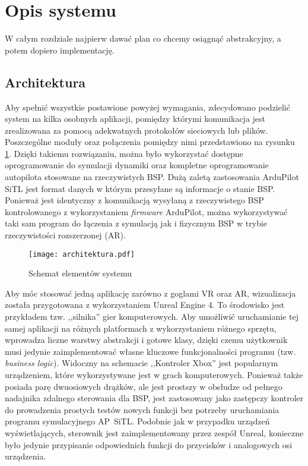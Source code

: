 \newpage
\section{Opis systemu}
\label{sec:opis}

\begin{todo}
W całym rozdziale najpierw dawać plan co chcemy osiągnąć abstrakcyjny, a potem dopiero implementację.
\end{todo}

\subsection{Architektura}
\label{sec:architektura}

Aby spełnić wszystkie postawione powyżej wymagania, zdecydowano podzielić system na kilka osobnych aplikacji, pomiędzy którymi komunikacja jest zrealizowana za pomocą adekwatnych protokołów sieciowych lub plików. Poszczególne moduły oraz połączenia pomiędzy nimi przedstawiono na rysunku \ref{fig:architektura}. Dzięki takiemu rozwiązaniu, można było wykorzystać dostępne oprogramowanie do symulacji dynamiki oraz kompletne oprogramowanie autopilota stosowane na rzeczywistych BSP. Dużą zaletą zastosowania ArduPilot SiTL\cite{soft:sitl} jest format danych w którym przesyłane są informacje o stanie BSP. Ponieważ jest identyczny z komunikacją wysyłaną z rzeczywistego BSP kontrolowanego z wykorzystaniem \emph{firmware} ArduPilot, można wykorzystywać taki sam program do łączenia z symulacją jak i fizycznym BSP w trybie rzeczywistości rozszerzonej (AR).

\begin{figure}[!h]
    \caption{Schemat elementów systemu}
    \label{fig:architektura}
    \centering \texttt{[image: architektura.pdf]}
\end{figure}

Aby móc stosować jedną aplikację zarówno z goglami VR oraz AR, wizualizacja została przygotowana z wykorzystaniem Unreal Engine 4\cite{soft:ue4}. To środowisko jest przykładem tzw. ,,silnika'' gier komputerowych. Aby umożliwić uruchamianie tej samej aplikacji na różnych platformach z wykorzystaniem różnego sprzętu, wprowadza liczne warstwy abstrakcji i gotowe klasy, dzięki czemu użytkownik musi jedynie zaimplementować własne kluczowe funkcjonalności programu (tzw. \emph{business logic}). Widoczny na schemacie ,,Kontroler Xbox'' jest popularnym urządzeniem, które wykorzystywane jest w grach komputerowych. Ponieważ także posiada parę dwuosiowych drążków, ale jest prostszy w obsłudze od pełnego nadajnika zdalnego sterowania dla BSP, jest zastosowany jako zastępczy kontroler do prowadzenia prostych testów nowych funkcji bez potrzeby uruchamiania programu symulacyjnego AP~SiTL. Podobnie jak w przypadku urządzeń wyświetlających, sterownik jest zaimplementowany przez zespół Unreal, konieczne było jedynie przypisanie odpowiednich funkcji do przycisków i analogowych osi urządzenia.

